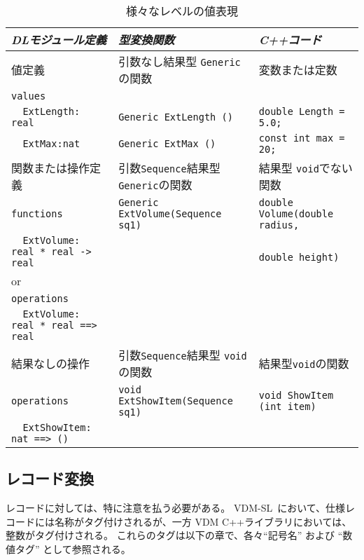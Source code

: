 \documentclass[\pformat,12pt]{jarticle}
\newcommand{\vdmslpp}{VDM-SL}
\begin{document}
\begin{table}
\begin{center}
\begin{sideways}
\begin{tabular}{|p{7cm}|p{7cm}|p{6cm}|}
\hline
{\it DLモジュール定義}&{\it 型変換関数}&{\it C++コード}\\
\hline \hline
値定義&引数なし結果型 {\tt Generic}の関数&変数または定数 \\ \hline
\verb+values+            & & \\
\verb+  ExtLength: real+ & \verb+Generic ExtLength ()+ & \verb+double Length = 5.0;+ \\
\verb+  ExtMax:nat+      & \verb+Generic ExtMax ()+    & \verb+const int max = 20;+ \\ \hline\hline
関数または操作定義 & 
引数{\tt Sequence}結果型 {\tt Generic}の関数 & 
結果型 {\tt void}でない関数 \\ \hline
\verb+functions+ & \verb+Generic ExtVolume(Sequence sq1)+ & \verb+double Volume(double radius,+ \\
\verb+  ExtVolume: real * real -> real+ &                 & \verb+              double height)+ \\
or & & \\
\verb+operations+ & & \\
\verb+  ExtVolume: real * real ==> real+ & & \\ \hline \hline
結果なしの操作
& 引数{\tt Sequence}結果型 {\tt void}の関数&
結果型{\tt void}の関数 \\ \hline
\verb+operations+ & \verb+void ExtShowItem(Sequence sq1)+ & \verb+void ShowItem (int item)+ \\
\verb+  ExtShowItem: nat ==> ()+ & & \\[1ex]
\hline \hline
\end{tabular}
\end{sideways}
\end{center}
\caption{様々なレベルの値表現} 
\label{table1}
\end{table}

\subsection{レコード変換}

レコードに対しては、特に注意を払う必要がある。
 \vdmslpp\ において、仕様レコードには名称がタグ付けされるが、一方 VDM C++ライブラリにおいては、整数がタグ付けされる。
これらのタグは以下の章で、各々``記号名'' および ``数値タグ'' として参照される。
\end{document}
